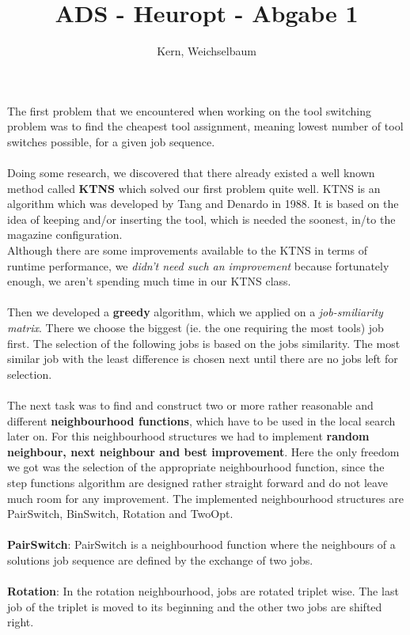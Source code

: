 \documentclass[12pt]{article}
\title{ADS - Heuropt - Abgabe 1}
\author{Kern, Weichselbaum}
\begin{document}
	
\maketitle
The first problem that we encountered when working on the tool switching problem was to find the cheapest tool assignment, meaning 
 lowest number of tool switches possible, for a given job sequence. 
\\
\\
Doing some research, we discovered that there already existed a well known method called \textbf{KTNS} which solved our first 
problem quite well. KTNS is an algorithm which was developed by Tang and Denardo
in 1988. It is based on the idea of keeping and/or inserting the tool, which is needed the soonest, in/to the magazine configuration.
\\
Although there are some improvements available to the KTNS in terms of runtime performance, we \textit{didn't need such an improvement} because fortunately enough, we aren't spending much time in our KTNS class.
\\
\\
Then we developed a \textbf{greedy} algorithm, which we applied on a \textit{job-smiliarity matrix}.
There we choose the biggest (ie. the one requiring the most tools) job first. The selection of the following jobs is 
based on the jobs similarity. The most similar job with the least difference is 
chosen next until there are no jobs left for selection.
\\
\\
The next task was to find and construct two or more 
rather reasonable and different \textbf{neighbourhood functions}, which have to be used in the local search
later on. For this neighbourhood structures we had to implement \textbf{random neighbour, 
next neighbour and best improvement}. Here the only freedom we got was the selection
of the appropriate neighbourhood function, since the step functions algorithm are 
designed rather straight forward and do not leave much room for any improvement. 
The implemented neighbourhood structures are PairSwitch, BinSwitch, Rotation and TwoOpt.
\\
\\
\textbf{PairSwitch}:  PairSwitch is a neighbourhood function where the neighbours of a solutions
job sequence are defined by the exchange of two jobs.
\\
\\
\textbf{Rotation}: In the rotation neighbourhood, jobs are rotated triplet wise. The last job 
of the triplet is moved to its beginning and the other two jobs are shifted right.
\end{document}
